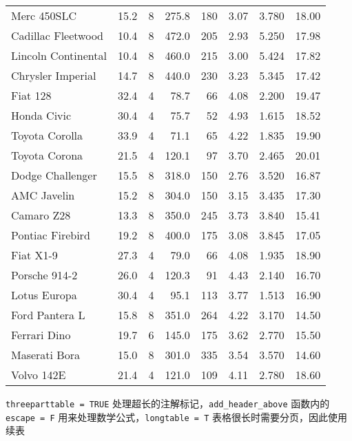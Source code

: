 \documentclass[]{book}
\begin{document}
\begin{ThreePartTable}
\begin{longtable}[t]{lrrrrrrr}
Merc 450SLC & 15.2 & 8 & 275.8 & 180 & 3.07 & 3.780 & 18.00\\
Cadillac Fleetwood & 10.4 & 8 & 472.0 & 205 & 2.93 & 5.250 & 17.98\\
\addlinespace
Lincoln Continental & 10.4 & 8 & 460.0 & 215 & 3.00 & 5.424 & 17.82\\
Chrysler Imperial & 14.7 & 8 & 440.0 & 230 & 3.23 & 5.345 & 17.42\\
Fiat 128 & 32.4 & 4 & 78.7 & 66 & 4.08 & 2.200 & 19.47\\
Honda Civic & 30.4 & 4 & 75.7 & 52 & 4.93 & 1.615 & 18.52\\
Toyota Corolla & 33.9 & 4 & 71.1 & 65 & 4.22 & 1.835 & 19.90\\
\addlinespace
Toyota Corona & 21.5 & 4 & 120.1 & 97 & 3.70 & 2.465 & 20.01\\
Dodge Challenger & 15.5 & 8 & 318.0 & 150 & 2.76 & 3.520 & 16.87\\
AMC Javelin & 15.2 & 8 & 304.0 & 150 & 3.15 & 3.435 & 17.30\\
Camaro Z28 & 13.3 & 8 & 350.0 & 245 & 3.73 & 3.840 & 15.41\\
Pontiac Firebird & 19.2 & 8 & 400.0 & 175 & 3.08 & 3.845 & 17.05\\
\addlinespace
Fiat X1-9 & 27.3 & 4 & 79.0 & 66 & 4.08 & 1.935 & 18.90\\
Porsche 914-2 & 26.0 & 4 & 120.3 & 91 & 4.43 & 2.140 & 16.70\\
Lotus Europa & 30.4 & 4 & 95.1 & 113 & 3.77 & 1.513 & 16.90\\
Ford Pantera L & 15.8 & 8 & 351.0 & 264 & 4.22 & 3.170 & 14.50\\
Ferrari Dino & 19.7 & 6 & 145.0 & 175 & 3.62 & 2.770 & 15.50\\
\addlinespace
Maserati Bora & 15.0 & 8 & 301.0 & 335 & 3.54 & 3.570 & 14.60\\
Volvo 142E & 21.4 & 4 & 121.0 & 109 & 4.11 & 2.780 & 18.60\\*
\end{longtable}
\end{ThreePartTable}

\texttt{threeparttable\ =\ TRUE}
处理超长的注解标记，\texttt{add\_header\_above} 函数内的
\texttt{escape\ =\ F} 用来处理数学公式，\texttt{longtable\ =\ T}
表格很长时需要分页，因此使用续表
\end{document}
